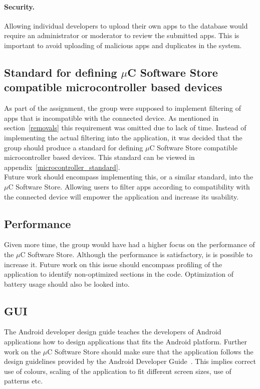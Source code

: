 	\paragraph{Security.} Allowing individual developers to upload their own apps to the database would require an administrator or moderator to review the submitted apps. This is important to avoid uploading of malicious apps and duplicates in the system.

	\subsection{Standard for defining $\mu$C Software Store compatible microcontroller based devices}
	As part of the assignment, the group were supposed to implement filtering of apps that is incompatible with the connected device. As mentioned in section~\ref{removals} this requirement was omitted due to lack of time. Instead of implementing the actual filtering into the application, it was decided that the group should produce a standard for defining $\mu$C Software Store compatible microcontroller based devices. This standard can be viewed in appendix~\ref{microcontroller_standard}. \\
	\newline
	Future work should encompass implementing this, or a similar standard, into the $\mu$C Software Store. Allowing users to filter apps according to compatibility with the connected device will empower the application and increase its usability.

	\subsection{Performance}
	Given more time, the group would have had a higher focus on the performance of the $\mu$C Software Store. Although the performance is satisfactory, is is possible to increase it. Future work on this issue should encompass profiling of the application to identify non-optimized sections in the code. Optimization of battery usage should also be looked into.

	\subsection{GUI}
	The Android developer design guide teaches the developers of Android applications how to design applications that fits the Android platform. Further work on the $\mu$C Software Store should make sure that the application follows the design guidelines provided by the Android Developer Guide~\cite{android-dev-guide}. This implies correct use of colours, scaling of the application to fit different screen sizes, use of patterns etc.

